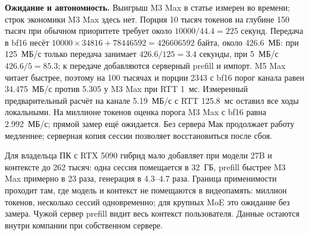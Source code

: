 \textbf{Ожидание и автономность.} Выигрыш M3 Max в статье измерен во времени; строк экономики M3 Max здесь нет.
Порция 10 тысяч токенов на глубине 150 тысяч при обычном приоритете требует около $10000/44.4=225$ секунд.
Передача в bf16 несёт $10000\times34816+78446592=426606592$ байта, около 426.6~МБ:
при 125~МБ/с только передача занимает $426.6/125=3.4$ секунды, при 5~МБ/с $426.6/5=85.3$;
к передаче добавляются серверный prefill и импорт. M5 Max читает быстрее, поэтому на 100 тысячах и порции 2343
с bf16 порог канала равен 34.475~МБ/с против 5.305 у M3 Max при RTT 1~мс.
Измеренный предварительный расчёт на канале 5.19~МБ/с с RTT 125.8~мс оставил все ходы локальными.
На миллионе токенов оценка порога M3 Max с bf16 равна 2.992~МБ/с; прямой замер ещё ожидается.
Без сервера Мак продолжает работу медленнее; серверная копия сессии позволяет восстановиться после сбоя.

Для владельца ПК с RTX 5090 гибрид мало добавляет при модели 27B и контексте до 262 тысяч:
одна сессия помещается в 32~ГБ, prefill быстрее M3 Max примерно в 23 раза, генерация в 4.3--4.7 раза.
Граница применимости проходит там, где модель и контекст не помещаются в видеопамять: миллион токенов,
несколько сессий одновременно; для крупных MoE это ожидание без замера.
Чужой сервер prefill видит весь контекст пользователя. Данные остаются внутри компании при собственном сервере.
